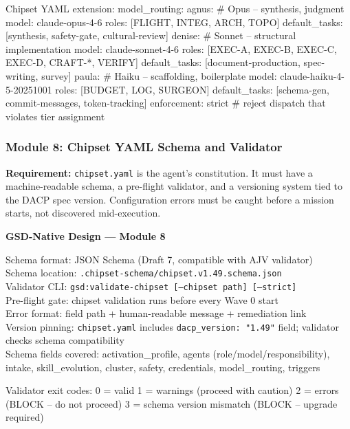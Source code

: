 \documentclass[11pt,letterpaper]{article}
\begin{document}
\begin{asciibox}
Chipset YAML extension:
model\_routing:
  agnus:    \# Opus -- synthesis, judgment
    model: claude-opus-4-6
    roles: [FLIGHT, INTEG, ARCH, TOPO]
    default\_tasks: [synthesis, safety-gate, cultural-review]
  denise:   \# Sonnet -- structural implementation
    model: claude-sonnet-4-6
    roles: [EXEC-A, EXEC-B, EXEC-C, EXEC-D, CRAFT-*, VERIFY]
    default\_tasks: [document-production, spec-writing, survey]
  paula:    \# Haiku -- scaffolding, boilerplate
    model: claude-haiku-4-5-20251001
    roles: [BUDGET, LOG, SURGEON]
    default\_tasks: [schema-gen, commit-messages, token-tracking]
  enforcement: strict   \# reject dispatch that violates tier assignment
\end{asciibox}

\subsubsection{Module 8: Chipset YAML Schema and Validator}

\textbf{Requirement:} \texttt{chipset.yaml} is the agent's constitution. It must have a machine-readable schema, a pre-flight validator, and a versioning system tied to the DACP spec version. Configuration errors must be caught before a mission starts, not discovered mid-execution.

\begin{implbox}
\textbf{GSD-Native Design --- Module 8}

Schema format: JSON Schema (Draft 7, compatible with AJV validator)\\
Schema location: \texttt{.chipset-schema/chipset.v1.49.schema.json}\\
Validator CLI: \texttt{gsd:validate-chipset [--chipset path] [--strict]}\\
Pre-flight gate: chipset validation runs before every Wave 0 start\\
Error format: field path + human-readable message + remediation link\\
Version pinning: \texttt{chipset.yaml} includes \texttt{dacp\_version: "1.49"} field; validator checks schema compatibility\\
Schema fields covered: activation\_profile, agents (role/model/responsibility), intake, skill\_evolution, cluster, safety, credentials, model\_routing, triggers

Validator exit codes:
  0 = valid
  1 = warnings (proceed with caution)
  2 = errors (BLOCK -- do not proceed)
  3 = schema version mismatch (BLOCK -- upgrade required)
\end{implbox}
\end{document}
